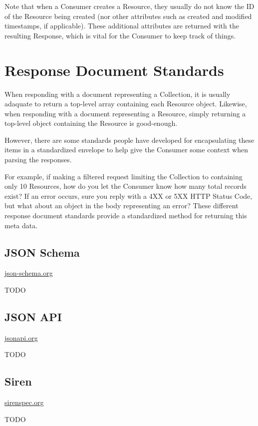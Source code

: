 \documentclass{book}
\begin{document}
Note that when a Consumer creates a Resource, they usually do not know the ID of the Resource being created (nor other attributes such as created and modified timestamps, if applicable). These additional attributes are returned with the resulting Response, which is vital for the Consumer to keep track of things.


\chapter{Response Document Standards}

When responding with a document representing a Collection, it is usually adaquate to return a top-level array containing each Resource object. Likewise, when responding with a document representing a Resource, simply returning a top-level object containing the Resource is good-enough.

However, there are some standards people have developed for encapsulating these items in a standardized envelope to help give the Consumer some context when parsing the responses.

For example, if making a filtered request limiting the Collection to containing only 10 Resources, how do you let the Consumer know how many total records exist? If an error occurs, sure you reply with a 4XX or 5XX HTTP Status Code, but what about an object in the body representing an error? These different response document standards provide a standardized method for returning this meta data.

\section{JSON Schema}

\href{http://json-schema.org/}{json-schema.org}

TODO

\section{JSON API}

\href{http://jsonapi.org/}{jsonapi.org}

TODO

\section{Siren}

\href{http://sirenspec.org}{sirenspec.org}

TODO
\end{document}
